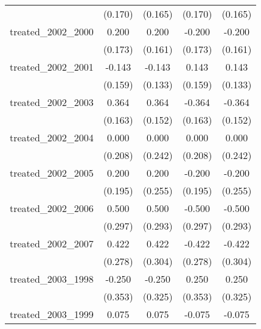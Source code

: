 {\begin{tabular}{l*{4}{c}}
            &     (0.170)         &     (0.165)         &     (0.170)         &     (0.165)         \\
[1em]
treated\_2002\_2000&       0.200         &       0.200         &      -0.200         &      -0.200         \\
            &     (0.173)         &     (0.161)         &     (0.173)         &     (0.161)         \\
[1em]
treated\_2002\_2001&      -0.143         &      -0.143         &       0.143         &       0.143         \\
            &     (0.159)         &     (0.133)         &     (0.159)         &     (0.133)         \\
[1em]
treated\_2002\_2003&       0.364\sym{*}  &       0.364\sym{*}  &      -0.364\sym{*}  &      -0.364\sym{*}  \\
            &     (0.163)         &     (0.152)         &     (0.163)         &     (0.152)         \\
[1em]
treated\_2002\_2004&       0.000         &       0.000         &       0.000         &       0.000         \\
            &     (0.208)         &     (0.242)         &     (0.208)         &     (0.242)         \\
[1em]
treated\_2002\_2005&       0.200         &       0.200         &      -0.200         &      -0.200         \\
            &     (0.195)         &     (0.255)         &     (0.195)         &     (0.255)         \\
[1em]
treated\_2002\_2006&       0.500         &       0.500         &      -0.500         &      -0.500         \\
            &     (0.297)         &     (0.293)         &     (0.297)         &     (0.293)         \\
[1em]
treated\_2002\_2007&       0.422         &       0.422         &      -0.422         &      -0.422         \\
            &     (0.278)         &     (0.304)         &     (0.278)         &     (0.304)         \\
[1em]
treated\_2003\_1998&      -0.250         &      -0.250         &       0.250         &       0.250         \\
            &     (0.353)         &     (0.325)         &     (0.353)         &     (0.325)         \\
[1em]
treated\_2003\_1999&       0.075         &       0.075         &      -0.075         &      -0.075         \\

\end{tabular}}
